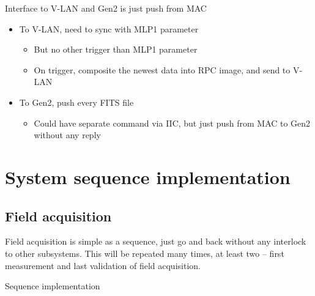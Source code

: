 \documentclass[a4paper,notitlepage]{article}
\begin{document}
Interface to V-LAN and Gen2 is just push from MAC
\begin{itemize}
  \item To V-LAN, need to sync with MLP1 parameter
  \begin{itemize}
    \item But no other trigger than MLP1 parameter
    \item On trigger, composite the newest data into RPC image, and send to V-LAN
  \end{itemize}
  \item To Gen2, push every FITS file
  \begin{itemize}
    \item Could have separate command via IIC, but just push from MAC to Gen2 without any reply
  \end{itemize}
\end{itemize}


\section{System sequence implementation}

\subsection{Field acquisition}

Field acquisition is simple as a sequence, just go and back without any interlock to other subsystems. This will be repeated many times, at least two -- first measurement and last validation of field acquisition. 

Sequence implementation
\end{document}
